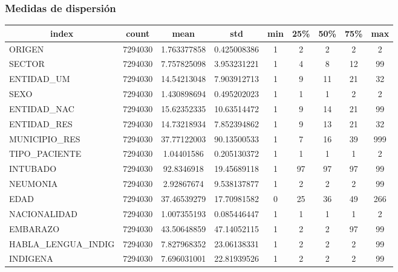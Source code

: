 \clearpage

\subsubsection{Medidas de dispersión}
\begin{table}[h]
\resizebox{15cm}{!} {

\begin{tabular}{|l|c|c|c|c|c|c|c|c|}
\hline
\multicolumn{1}{|c|}{\textbf{index}} & \textbf{count} & \textbf{mean} & \textbf{std} & \textbf{min} & \textbf{25\%} & \textbf{50\%} & \textbf{75\%} & \textbf{max} \\ \hline
ORIGEN                  & 7294030 & 1.763377858 & 0.425008386 & 1 & 2  & 2  & 2  & 2   \\ \hline
SECTOR                  & 7294030 & 7.757825098 & 3.953231221 & 1 & 4  & 8  & 12 & 99  \\ \hline
ENTIDAD\_UM             & 7294030 & 14.54213048 & 7.903912713 & 1 & 9  & 11 & 21 & 32  \\ \hline
SEXO                    & 7294030 & 1.430898694 & 0.495202023 & 1 & 1  & 1  & 2  & 2   \\ \hline
ENTIDAD\_NAC            & 7294030 & 15.62352335 & 10.63514472 & 1 & 9  & 14 & 21 & 99  \\ \hline
ENTIDAD\_RES            & 7294030 & 14.73218934 & 7.852394862 & 1 & 9  & 13 & 21 & 32  \\ \hline
MUNICIPIO\_RES          & 7294030 & 37.77122003 & 90.13500533 & 1 & 7  & 16 & 39 & 999 \\ \hline
TIPO\_PACIENTE          & 7294030 & 1.04401586  & 0.205130372 & 1 & 1  & 1  & 1  & 2   \\ \hline
INTUBADO                & 7294030 & 92.8346918  & 19.45689118 & 1 & 97 & 97 & 97 & 99  \\ \hline
NEUMONIA                & 7294030 & 2.92867674  & 9.538137877 & 1 & 2  & 2  & 2  & 99  \\ \hline
EDAD                    & 7294030 & 37.46539279 & 17.70981582 & 0 & 25 & 36 & 49 & 266 \\ \hline
NACIONALIDAD            & 7294030 & 1.007355193 & 0.085446447 & 1 & 1  & 1  & 1  & 2   \\ \hline
EMBARAZO                & 7294030 & 43.50648859 & 47.14052115 & 1 & 2  & 2  & 97 & 99  \\ \hline
HABLA\_LENGUA\_INDIG    & 7294030 & 7.827968352 & 23.06138331 & 1 & 2  & 2  & 2  & 99  \\ \hline
INDIGENA                & 7294030 & 7.696031001 & 22.81939526 & 1 & 2  & 2  & 2  & 99  \\ \hline

\end{tabular}}
\end{table}
